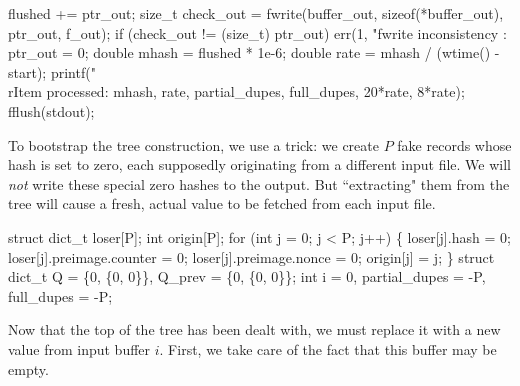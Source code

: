 \documentclass{article}%
\begin{document}
\nwendcode{}\endmoddef\nwstartdeflinemarkup{}\nwenddeflinemarkup
flushed += ptr_out;
size_t check_out = fwrite(buffer_out, sizeof(*buffer_out), ptr_out, f_out);
if (check_out != (size_t) ptr_out)
        err(1, "fwrite inconsistency : %
ptr_out = 0;
double mhash = flushed * 1e-6;
double rate = mhash / (wtime() - start);
printf("\\rItem processed: %
        mhash, rate, partial_dupes, full_dupes, 20*rate, 8*rate);
fflush(stdout);



\nwendcode{}To bootstrap the tree construction, we use a trick: we create $P$ fake
records whose hash is set to zero, each supposedly originating from a
different input file. We will \emph{not} write these special zero hashes to
the output. But ``extracting" them from the tree will cause a fresh, actual
value to be fetched from each input file.

\nwenddocs{}\endmoddef\nwstartdeflinemarkup{}\nwenddeflinemarkup
struct dict_t loser[P];
int origin[P];
for (int j = 0; j < P; j++) \{
        loser[j].hash = 0;
        loser[j].preimage.counter = 0;
        loser[j].preimage.nonce = 0;
        origin[j] = j;
\}
struct dict_t Q = \{0, \{0, 0\}\}, Q_prev = \{0, \{0, 0\}\};
int i = 0, partial_dupes = -P, full_dupes = -P;

\nwendcode{}Now that the top of the tree has been dealt with, we must replace it with a
new value from input buffer $i$. First, we take care of the fact that this
buffer may be empty.
\end{document}
